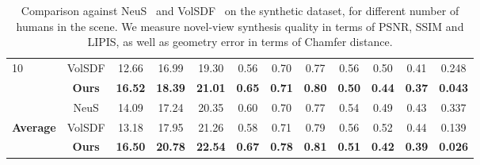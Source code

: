 \begin{table*}[h!]
\begin{center}
{\begin{tabular}{l|c|ccc|ccc|ccc|c }
10 & VolSDF & 12.66&16.99 &19.30&0.56&0.70&0.77&0.56&0.50&0.41&0.248\\
 &  \textbf{Ours}&\textcolor{textcolor}{\textbf{16.52}} &\textcolor{textcolor}{\textbf{18.39}}&\textcolor{textcolor}{\textbf{21.01}} &\textcolor{textcolor}{\textbf{0.65}}&\textcolor{textcolor}{\textbf{0.71}}&\textcolor{textcolor}{\textbf{0.80}}&\textcolor{textcolor}{\textbf{0.50}}&\textcolor{textcolor}{\textbf{0.44}}&\textcolor{textcolor}{\textbf{0.37}}&\textcolor{textcolor}{\textbf{0.043}}\\
 \hline
 & NeuS &14.09&17.24&20.35 &0.60	&0.70	&0.77 &0.54 &0.49 &0.43&0.337\\
\textbf{Average}& VolSDF&13.18 &17.95&	21.26 &0.58 &0.71 &	0.79 &0.56	&0.52	&0.44&0.139\\
 &\textbf{Ours}&\textcolor{textcolor}{\textbf{16.50}} &\textcolor{textcolor}{\textbf{20.78}}&\textcolor{textcolor}{\textbf{22.54}} &\textcolor{textcolor}{\textbf{0.67}}&\textcolor{textcolor}{\textbf{0.78}}&\textcolor{textcolor}{\textbf{0.81}} &\textcolor{textcolor}{\textbf{0.51}}&\textcolor{textcolor}{\textbf{0.42}}&\textcolor{textcolor}{\textbf{0.39}}&\textcolor{textcolor}{\textbf{0.026}}\\
\bottomrule[1.2pt]
\end{tabular}}
\caption{Comparison against NeuS~\cite{wang2021neus} and VolSDF~\cite{yariv2021volume} on the synthetic dataset, for different number of humans in the scene. We measure novel-view synthesis quality in terms of PSNR, SSIM and LIPIS, as well as geometry error in terms of Chamfer distance.}
\label{tab:syn}
\end{center}
\end{table*}


